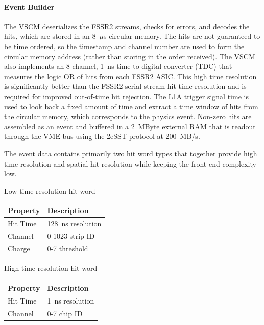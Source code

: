 \paragraph{Event Builder}
The VSCM deserializes the FSSR2 streams, checks for errors, and decodes the hits, which are stored in an 8~$\mu$s circular memory. The hits are not guaranteed to be time ordered, so the timestamp and channel number are used to form the circular memory address (rather than storing in the order received). The VSCM also implements an 8-channel, 1~ns time-to-digital converter (TDC) that measures the logic OR of hits from each FSSR2 ASIC. This high time resolution is significantly better than the FSSR2 serial stream hit time resolution and is required for improved out-of-time hit rejection. The L1A trigger signal time is used to look back a fixed amount of time and extract a time window of hits from the circular memory, which corresponds to the physics event. Non-zero hits are assembled as an event and buffered in a 2~MByte external RAM that is readout through the VME bus using the 2eSST protocol at 200~MB/s.

The event data contains primarily two hit word types that together provide high time resolution and spatial hit resolution while keeping the front-end complexity low.

\begin{center}
	Low time resolution hit word\\
	\begin{tabular}{| l | l |}
		\hline \hline
		Property	& Description		\\
		\hline
		Hit Time	& 128~ns resolution	\\
		Channel		& 0-1023 strip ID	\\
		Charge		& 0-7 threshold		\\
		\hline \hline
	\end{tabular}
\end{center}

\begin{center}
	High time resolution hit word\\
	\begin{tabular}{| l | l |}
		\hline \hline
		Property	& Description		\\
		\hline
		Hit Time	& 1~ns resolution	\\
		Channel		& 0-7 chip ID		\\
		\hline \hline
	\end{tabular}
\end{center}

